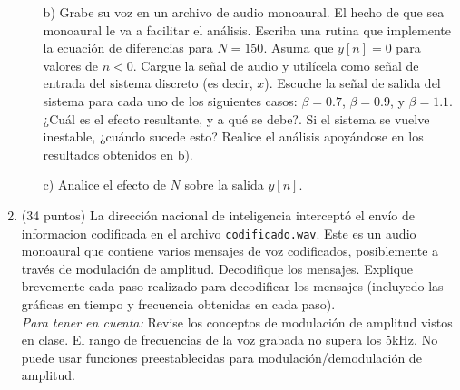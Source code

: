 \documentclass[11pt,spanish]{article}
\begin{document}
\begin{enumerate}
\begin{enumerate}[label=\textbf{\Alph*)},ref=\Alph*,leftmargin=*]
        \item[b)] Grabe su voz en un archivo de audio monoaural. El hecho de que sea monoaural le va a facilitar el análisis. Escriba una rutina que implemente la ecuación de diferencias para $N=150$. Asuma que $y[n]=0$ para valores de $n<0$. Cargue la señal de audio y utilícela como señal de entrada del sistema discreto (es decir, $x$). Escuche la señal de salida del sistema para cada uno de los siguientes casos: $\beta=0.7$, $\beta=0.9$, y $\beta=1.1$. ¿Cuál es el efecto resultante, y a qué se debe?. Si el sistema se vuelve inestable, ¿cuándo sucede esto? Realice el análisis apoyándose en los resultados obtenidos en b).
        \item[c)] Analice el efecto de $N$ sobre la salida $y[n]$.
      \end{enumerate}
      \vspace{1cm}
      \item (34 puntos) La dirección nacional de inteligencia interceptó el envío de informacion codificada en el archivo \texttt{codificado.wav}. Este es un audio monoaural que contiene varios mensajes de voz codificados, posiblemente a través de modulación de amplitud. Decodifique los mensajes. Explique brevemente cada paso realizado para decodificar los mensajes (incluyedo las gráficas en tiempo y frecuencia obtenidas en cada paso).\\
          \emph{Para tener en cuenta:} Revise los conceptos de modulación de amplitud vistos en clase. El rango de frecuencias de la voz grabada no supera los 5kHz. No puede usar funciones preestablecidas para modulación/demodulación de amplitud.
\end{enumerate}



 
\end{document}

